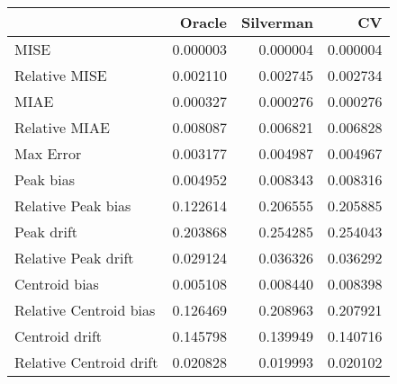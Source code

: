 \begin{tabular}{lrrr}
  \hline
 & Oracle & Silverman & CV \\ 
  \hline
MISE & 0.000003 & 0.000004 & 0.000004 \\ 
  Relative MISE & 0.002110 & 0.002745 & 0.002734 \\ 
  MIAE & 0.000327 & 0.000276 & 0.000276 \\ 
  Relative MIAE & 0.008087 & 0.006821 & 0.006828 \\ 
  Max Error & 0.003177 & 0.004987 & 0.004967 \\ 
  Peak bias & 0.004952 & 0.008343 & 0.008316 \\ 
  Relative Peak bias & 0.122614 & 0.206555 & 0.205885 \\ 
  Peak drift & 0.203868 & 0.254285 & 0.254043 \\ 
  Relative Peak drift & 0.029124 & 0.036326 & 0.036292 \\ 
  Centroid bias & 0.005108 & 0.008440 & 0.008398 \\ 
  Relative Centroid bias & 0.126469 & 0.208963 & 0.207921 \\ 
  Centroid drift & 0.145798 & 0.139949 & 0.140716 \\ 
  Relative Centroid drift & 0.020828 & 0.019993 & 0.020102 \\ 
   \hline
\end{tabular}
